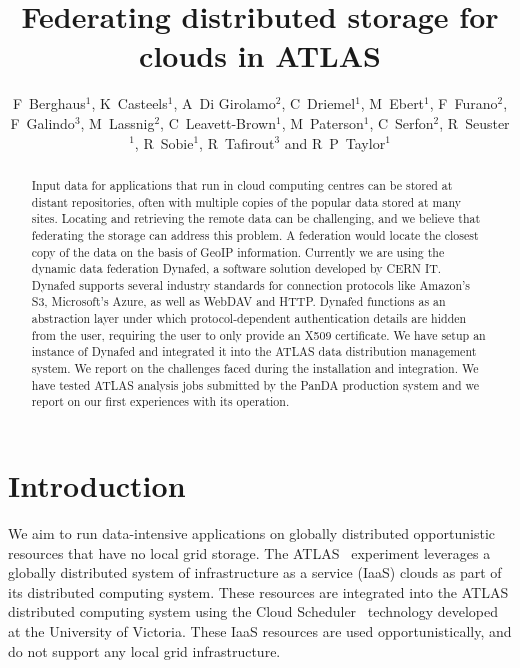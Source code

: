 \documentclass[a4paper]{jpconf}
\begin{document}
\title{Federating distributed storage for clouds in ATLAS}

\author{F~Berghaus$^1$, K~Casteels$^1$, A~Di Girolamo$^2$, C~Driemel$^1$, M~Ebert$^1$, F~Furano$^2$, F~Galindo$^3$, M~Lassnig$^2$, C~Leavett-Brown$^1$, M~Paterson$^1$, C~Serfon$^2$, R~Seuster$^1$, R~Sobie$^1$, R~Tafirout$^3$ and R~P~Taylor$^1$}
\address{$^1$ Department of Physics and Astronomy, University of Victoria, Finnerty Road, Victoria V8P~5C2, Canada}
\address{$^2$ CERN, Geneva 1211, Switzerland}
\address{$^3$ TRIUMF, Wesbrook Mall, Vancouver V6T~2A3 Canada}


\begin{abstract}
Input data for applications that run in cloud computing centres can be stored at distant repositories, often with multiple copies of the popular data stored at many sites. Locating and retrieving the remote data can be challenging, and we believe that federating the storage can address this problem. A federation would locate the closest copy of the data on the basis of GeoIP information. Currently we are using the dynamic data federation Dynafed, a software solution developed by CERN IT. Dynafed supports several industry standards for connection protocols like Amazon's S3, Microsoft's Azure, as well as WebDAV and HTTP. Dynafed functions as an abstraction layer under which protocol-dependent authentication details are  hidden from the user, requiring the user to only provide an X509 certificate. We have setup an instance of Dynafed and integrated it into the ATLAS data distribution management system. We report on the challenges faced during the installation and integration. We have tested ATLAS analysis jobs submitted by the PanDA production system and we report on our first experiences with its operation.
\end{abstract}

\section{Introduction}
We aim to run data-intensive applications on globally distributed opportunistic resources that have no local grid storage. The ATLAS~\cite{atlas} experiment leverages a globally distributed system of infrastructure as a service (IaaS) clouds as part of its distributed computing system. These resources are integrated into the ATLAS distributed computing system using the Cloud Scheduler~\cite{cloud-scheduler} technology developed at the University of Victoria. These IaaS resources are used opportunistically, and do not support any local grid infrastructure.
\end{document}

